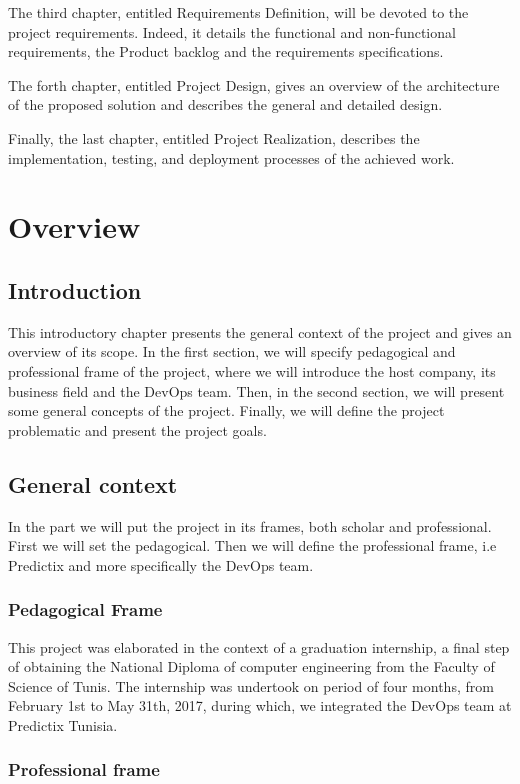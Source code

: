 The third chapter, entitled Requirements Definition, will be devoted to the
project requirements. Indeed, it details the functional and non-functional
requirements, the Product backlog and the requirements specifications.

The forth chapter, entitled Project Design, gives an overview of the
architecture of the proposed solution and describes the general and detailed
design.

Finally, the last chapter, entitled Project Realization, describes the
implementation, testing, and deployment processes of the achieved work.

\chapter{Overview}

\section*{Introduction}
This introductory chapter presents the general context of the project and gives
an overview of its scope. In the first section, we will specify pedagogical and
professional frame of the project, where we will introduce the host company, its
business field  and the DevOps team. Then, in the second section, we will
present some general concepts of the project. Finally, we will define the
project problematic and present the project goals.

\pagebreak

\section{General context}
In the part we will put the project in its frames, both scholar and
professional. First we will set the pedagogical. Then we will define the
professional frame, i.e Predictix and more specifically the DevOps team.

\subsection{Pedagogical Frame}
This project was elaborated in the context of a graduation internship, a final
step of obtaining the National Diploma of computer engineering from the Faculty
of Science of Tunis.
The internship was undertook on period of four months, from February 1st to May
31th, 2017, during which, we integrated the DevOps team at Predictix Tunisia.
\subsection{Professional frame}

